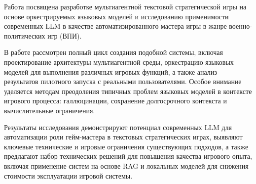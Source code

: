 Работа посвящена разработке мультиагентной текстовой стратегической игры на основе оркестрируемых языковых моделей и исследованию применимости современных LLM в качестве автоматизированного мастера игры в жанре военно-политических игр (ВПИ).

В работе рассмотрен полный цикл создания подобной системы, включая проектирование архитектуры мультиагентной среды, оркестрацию языковых моделей для выполнения различных игровых функций, а также анализ результатов пилотного запуска с реальными пользователями. Особое внимание уделяется методам преодоления типичных проблем языковых моделей в контексте игрового процесса: галлюцинации, сохранение долгосрочного контекста и вычислительные ограничения.

Результаты исследования демонстрируют потенциал современных LLM для автоматизации роли гейм-мастера в текстовых стратегических играх, выявляют ключевые технические и игровые ограничения существующих подходов, а также предлагают набор технических решений для повышения качества игрового опыта, включая применение систем на основе RAG и локальных моделей для снижения стоимости эксплуатации игровой системы.